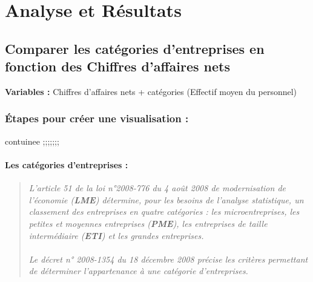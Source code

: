 \documentclass[mstat,12pt]{unswthesis}
\begin{document}
\chapter{Analyse et Résultats}\label{analyse-et-ruxe9sultats}

\section{\texorpdfstring{\textbf{Comparer les catégories d'entreprises
en fonction des Chiffres d'affaires
nets}}{Comparer les catégories d'entreprises en fonction des Chiffres d'affaires nets}}\label{comparer-les-catuxe9gories-dentreprises-en-fonction-des-chiffres-daffaires-nets}

\bigskip

\textbf{Variables :} Chiffres d'affaires nets + catégories (Effectif
moyen du personnel)

\subsection{Étapes pour créer une visualisation
:}\label{uxe9tapes-pour-cruxe9er-une-visualisation}

contuinee ;;;;;;;

\subsubsection{Les catégories d'entreprises
:}\label{les-catuxe9gories-dentreprises}

\bigskip
\scriptsize
\begin{quote}
\textit{L’article 51 de la loi n°2008-776 du 4 août 2008 de modernisation de l’économie (\textbf{LME}) détermine, pour les besoins de l’analyse statistique, un classement des entreprises en quatre catégories : les microentreprises, les petites et moyennes entreprises (\textbf{PME}), les entreprises de taille intermédiaire (\textbf{ETI}) et les grandes entreprises.\\ \\Le décret n° 2008-1354 du 18 décembre 2008 précise les critères permettant de déterminer l’appartenance à une catégorie d'entreprises.}
\end{quote}
\normalsize
\end{document}
